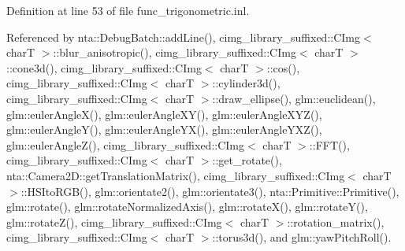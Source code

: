 Definition at line 53 of file func\+\_\+trigonometric.\+inl.



Referenced by nta\+::\+Debug\+Batch\+::add\+Line(), cimg\+\_\+library\+\_\+suffixed\+::\+C\+Img$<$ char\+T $>$\+::blur\+\_\+anisotropic(), cimg\+\_\+library\+\_\+suffixed\+::\+C\+Img$<$ char\+T $>$\+::cone3d(), cimg\+\_\+library\+\_\+suffixed\+::\+C\+Img$<$ char\+T $>$\+::cos(), cimg\+\_\+library\+\_\+suffixed\+::\+C\+Img$<$ char\+T $>$\+::cylinder3d(), cimg\+\_\+library\+\_\+suffixed\+::\+C\+Img$<$ char\+T $>$\+::draw\+\_\+ellipse(), glm\+::euclidean(), glm\+::euler\+Angle\+X(), glm\+::euler\+Angle\+X\+Y(), glm\+::euler\+Angle\+X\+Y\+Z(), glm\+::euler\+Angle\+Y(), glm\+::euler\+Angle\+Y\+X(), glm\+::euler\+Angle\+Y\+X\+Z(), glm\+::euler\+Angle\+Z(), cimg\+\_\+library\+\_\+suffixed\+::\+C\+Img$<$ char\+T $>$\+::\+F\+F\+T(), cimg\+\_\+library\+\_\+suffixed\+::\+C\+Img$<$ char\+T $>$\+::get\+\_\+rotate(), nta\+::\+Camera2\+D\+::get\+Translation\+Matrix(), cimg\+\_\+library\+\_\+suffixed\+::\+C\+Img$<$ char\+T $>$\+::\+H\+S\+Ito\+R\+G\+B(), glm\+::orientate2(), glm\+::orientate3(), nta\+::\+Primitive\+::\+Primitive(), glm\+::rotate(), glm\+::rotate\+Normalized\+Axis(), glm\+::rotate\+X(), glm\+::rotate\+Y(), glm\+::rotate\+Z(), cimg\+\_\+library\+\_\+suffixed\+::\+C\+Img$<$ char\+T $>$\+::rotation\+\_\+matrix(), cimg\+\_\+library\+\_\+suffixed\+::\+C\+Img$<$ char\+T $>$\+::torus3d(), and glm\+::yaw\+Pitch\+Roll().

